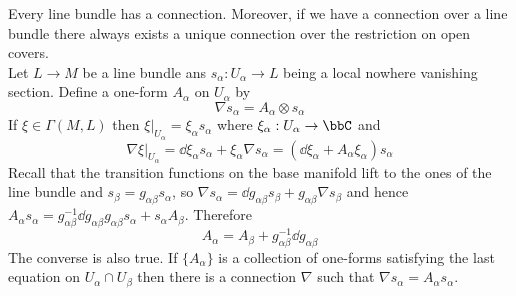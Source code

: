Every line bundle has a connection. Moreover, if we have a connection over a line bundle there always exists a unique connection over the restriction on open covers. \\
Let $L\rightarrow M$ be a line bundle ans $s_\alpha:U_\alpha\rightarrow L$ being a local nowhere vanishing section. Define a one-form $A_\alpha$ on $U_\alpha$ by 
\begin{equation}
    \nabla s_\alpha=A_\alpha\otimes s_\alpha
\end{equation}
If $\xi\in \Gamma(M,L)$ then $\xi|_{U_\alpha}=\xi_\alpha s_\alpha$ where $\xi_\alpha:U_\alpha\rightarrow \bbC$ and 
\begin{equation}
    \nabla \xi\big|_{U_\alpha}=\dd{\xi_\alpha}s_\alpha+\xi_\alpha \nabla s_\alpha=(\dd{\xi_\alpha}+A_\alpha \xi_\alpha)s_\alpha
\end{equation}
Recall that the transition functions on the base manifold lift to the ones of the line bundle and $s_\beta=g_{\alpha \beta}s_\alpha$, so $\nabla s_\alpha=\dd{g}_{\alpha \beta}s_\beta+g_{\alpha \beta}\nabla s_\beta$ and hence $A_\alpha s_\alpha=g^{-1}_{\alpha \beta} \dd{g}_{\alpha \beta}g_{\alpha \beta}s_\alpha+s_\alpha A_\beta$. Therefore 
\begin{equation}
    A_\alpha=A_\beta+g^{-1}_{\alpha \beta}\dd{g}_{\alpha \beta}
\end{equation}
The converse is also true. If $\{A_\alpha\}$ is a collection of one-forms satisfying the last equation on $U_\alpha\cap U_\beta$ then there is a connection $\nabla$ such that $\nabla s_\alpha=A_\alpha s_\alpha$.

